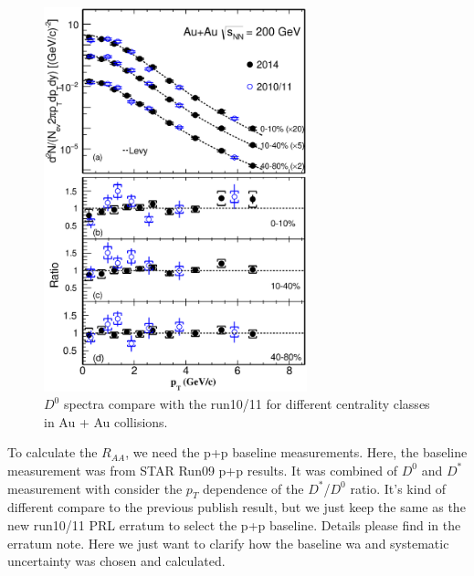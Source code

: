 \begin{figure}
\centering
\includegraphics[width=0.68\textwidth]{figure/Run14_D0HFT/D0_compareSpectra_run10.eps}
\caption{$D^{0}$ spectra compare with the run10/11 for different centrality classes in Au + Au collisions.}
\label{D0_compareSpectra_run10} 
\end{figure}

To calculate the $R_{AA}$, we need the p+p baseline measurements. Here, the baseline measurement was from STAR Run09 p+p results. It was combined of $D^0$ and $D^{*}$ measurement with consider the $p_T$ dependence of the $D^*$/$D^0$ ratio. It's kind of different compare to the previous publish result, but we just keep the same as the new run10/11 PRL erratum to select the p+p baseline. Details please find in the erratum note. Here we just want to clarify how the baseline wa and systematic uncertainty was chosen and calculated.

